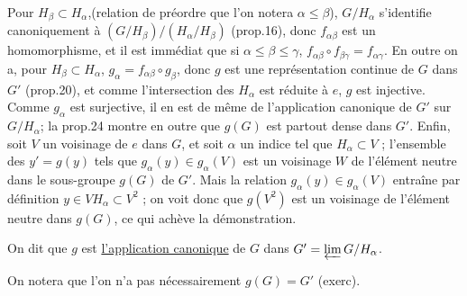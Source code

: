 Pour $H_\beta\subset H_\alpha$,(relation de préordre que l'on notera $\alpha\leq\beta$), $G/H_\alpha$ s'identifie canoniquement à $(G/H_\beta)/(H_\alpha/H_\beta)$ (prop.16), donc $f_{\alpha\beta}$ est un homomorphisme, et il est immédiat que si $\alpha\leq\beta\leq\gamma$, $f_{\alpha\beta}\circ f_{\beta\gamma}=f_{\alpha\gamma}$. En outre on a, pour $H_\beta\subset H_\alpha$, $g_\alpha=f_{\alpha\beta}\circ g_\beta$, donc $g$ est une représentation continue de $G$ dans $G'$ (prop.20), et comme l'intersection des $H_\alpha$ est réduite à $e$, $g$ est injective. Comme $g_\alpha$ est surjective, il en est de même de l'application canonique de $G'$ sur $G/H_\alpha$; la prop.24 montre en outre que $g(G)$ est partout dense dans $G'$. Enfin, soit $V$ un voisinage de $e$ dans $G$, et soit $\alpha$ un indice tel que $H_\alpha\subset V$ ; l'ensemble des $y'=g(y)$ tels que $g_\alpha(y)\in g_\alpha(V)$ est un voisinage $W$ de l'élément neutre dans le sous-groupe $g(G)$ de $G'$. Mais la relation $g_\alpha(y)\in g_\alpha(V)$ entraîne par définition $y\in VH_\alpha\subset V^2$ ; on voit donc que $g(V^2)$ est un voisinage de l'élément neutre dans $g(G)$, ce qui achève la démonstration.

On dit que $g$ est \uline{l'application canonique} de $G$ dans $G'=\varprojlim G/H_\alpha$.

On notera que l'on n'a pas nécessairement $g(G)=G'$ (exerc).
